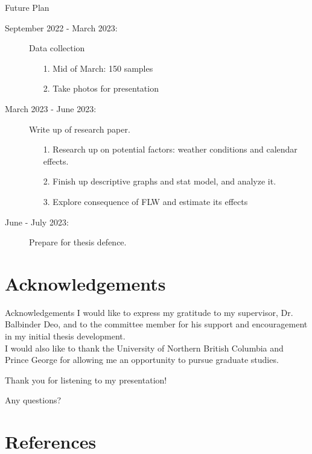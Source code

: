 \documentclass{beamer}
\renewcommand*{\bibfont}{\tiny}
\begin{document}
\begin{frame}{Future Plan}
    \begin{description}
        \item [September 2022 - March 2023:] Data collection
        \begin{enumerate}
            \item[1.] Mid of March: 150 samples
            \item[2.] Take photos for presentation
        \end{enumerate}
        \item [March 2023 - June 2023:] Write up of research paper.
        \begin{enumerate}
            \item[1.] Research up on potential factors: weather conditions and calendar effects.
            \item[2.] Finish up descriptive graphs and stat model, and analyze it.
            \item[3.] Explore consequence of FLW and estimate its effects
        \end{enumerate}
        \item [June - July 2023:] Prepare for thesis defence.
    \end{description}
\end{frame}

\section{Acknowledgements}
\begin{frame}{Acknowledgements}
I would like to express my gratitude to my supervisor, Dr. Balbinder Deo, and to the committee member for his support and encouragement in my initial thesis development.\\ 
I would also like to thank the University of Northern British Columbia and Prince George for allowing me an opportunity to pursue graduate studies.
\end{frame}

\begin{frame}{}
Thank you for listening to my presentation!

Any questions?
\end{frame}

\section{References}
\begin{frame}[allowframebreaks]
    \bibfont
    \printbibliography
\end{frame}
\end{document}
